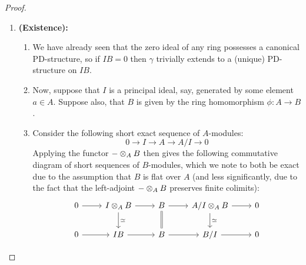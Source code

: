                     \begin{proof}
                        \noindent
                        \begin{enumerate}
                            \item \textbf{(Existence):} 
                                \noindent
                                \begin{enumerate}
                                    \item We have already seen that the zero ideal of any ring possesses a canonical PD-structure, so if $IB = 0$ then $\gamma$ trivially extends to a (unique) PD-structure on $IB$.
                                    \item Now, suppose that $I$ is a principal ideal, say, generated by some element $a \in A$. Suppose also, that $B$ is given by the ring homomorphism $\phi: A \to B$.
                                    \item Consider the following short exact sequence of $A$-modules:
                                        $$0 \to I \to A \to A/I \to 0$$
                                    Applying the functor $- \tensor_A B$ then gives the following commutative diagram of short sequences of $B$-modules, which we note to both be exact due to the assumption that $B$ is flat over $A$ (and less significantly, due to the fact that the left-adjoint $- \tensor_A B$ preserves finite colimits):
                                        $$
                                            \begin{tikzcd}
                                            	{0} & {I \tensor_A B} & {B} & {A/I \tensor_A B} & {0} \\
                                            	{0} & {IB} & {B} & {B/I} & {0}
                                            	\arrow["{\cong}", from=1-2, to=2-2]
                                            	\arrow[Rightarrow, from=1-3, to=2-3, no head]
                                            	\arrow["{\cong}", from=1-4, to=2-4]
                                            	\arrow[from=1-2, to=1-3]
                                            	\arrow[from=1-3, to=1-4]
                                            	\arrow[from=2-2, to=2-3]
                                            	\arrow[from=2-3, to=2-4]
                                            	\arrow[from=2-4, to=2-5]
                                            	\arrow[from=1-4, to=1-5]
                                            	\arrow[from=1-1, to=1-2]
                                            	\arrow[from=2-1, to=2-2]
                                            \end{tikzcd}
                                        $$
                                    

\end{enumerate}
\end{enumerate}
\end{proof}
